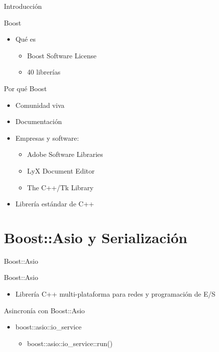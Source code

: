 \documentclass[spanish,xcolor=dvipsnames,svgnames]{beamer}
\begin{document}
\begin{frame}{Introducción}
  \begin{block}{Boost}
    \begin{itemize}
    \item Qué es
      \begin{itemize}
      \item Boost Software License
      \item 40 librerías
      \end{itemize}
    \end{itemize}
  \end{block}
  \begin{block}{Por qué Boost}
    \begin{itemize}
    \item Comunidad viva
    \item Documentación
    \item Empresas y software:
      \begin{itemize}
      \item Adobe Software Libraries
      \item LyX Document Editor
      \item The C++/Tk Library
      \end{itemize}
    \item Librería estándar de C++
    \end{itemize}
  \end{block}
\end{frame}


\section{Boost::Asio y Serialización}
\begin{frame}{Boost::Asio}
  \begin{block}{Boost::Asio}
    \begin{itemize}
    \item Librería C++ multi-plataforma para redes y programación de E/S
    \end{itemize}
  \end{block}

  \begin{block}{Asincronía con Boost::Asio}
    \begin{itemize}
    \item boost::asio::io\_service
      \begin{itemize}
      \item boost::asio::io\_service::run()
      \end{itemize}

    \end{itemize}
  \end{block}
\end{frame}
\end{document}
